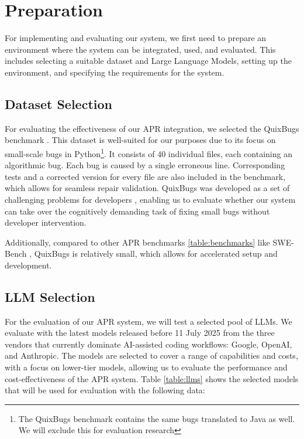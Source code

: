 \section{Preparation}

For implementing and evaluating our system, we first need to prepare an environment where the system can be integrated, used, and evaluated. This includes selecting a suitable dataset and Large Language Models, setting up the environment, and specifying the requirements for the system.

\subsection{Dataset Selection}

For evaluating the effectiveness of our APR integration, we selected the QuixBugs benchmark \cite{linQuixBugsMultilingualProgram2017}. This dataset is well-suited for our purposes due to its focus on small-scale bugs in Python\footnote{The QuixBugs benchmark contains the same bugs translated to Java as well. We will exclude this for evaluation research}. It consists of 40 individual files, each containing an algorithmic bug. Each bug is caused by a single erroneous line. Corresponding tests and a corrected version for every file are also included in the benchmark, which allows for seamless repair validation. QuixBugs was developed as a set of challenging problems for developers \cite{linQuixBugsMultilingualProgram2017}, enabling us to evaluate whether our system can take over the cognitively demanding task of fixing small bugs without developer intervention.

Additionally, compared to other APR benchmarks \ref{table:benchmarks} like SWE-Bench \cite{jimenezSWEbenchCanLanguage2024}, QuixBugs is relatively small, which allows for accelerated setup and development.

\subsection{LLM Selection} \label{subsection:llm-selection}
For the evaluation of our APR system, we will test a selected pool of \acp{LLM}. We evaluate with the latest models released before 11 July 2025 from the three vendors that currently dominate AI-assisted coding workflows: Google, OpenAI, and Anthropic. The models are selected to cover a range of capabilities and costs, with a focus on lower-tier models, allowing us to evaluate the performance and cost-effectiveness of the APR system. Table \ref{table:llms} shows the selected models that will be used for evaluation with the following data:

